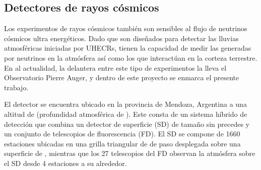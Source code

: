 	\subsection{Detectores de rayos c\'osmicos}
	
	Los experimentos de rayos c\'osmicos tambi\'en son sensibles al flujo de neutrinos c\'osmicos ultra energ\'eticos. 
	Dado que son dise\~nados para detectar las lluvias atmosf\'ericas iniciadas por UHECRs, tienen la capacidad de medir las generadas por neutrinos en la atm\'osfera as\'i como los que interact\'uan en la corteza terrestre.
	En al actualidad, la delantera entre este tipo de experimentos la lleva el Observatorio Pierre Auger, y dentro de este proyecto se enmarca el presente trabajo. 	





	El detector se encuentra ubicado en la provincia de Mendoza, Argentina a una altitud de  (profundidad atmosf\'erica de ).
	Este consta de un sistema h\'ibrido de detecci\'on que combina un detector de superficie (SD) de tama\~no sin precedes y un conjunto de telescopios de fluorescencia (FD).
	El SD se compone de 1660 estaciones \cher{} ubicadas en una grilla triangular de  de paso desplegada sobre una superficie de , mientras que los 27 telescopios del FD observan la atm\'osfera sobre el SD desde 4 estaciones a su alrededor.
	\fi %


